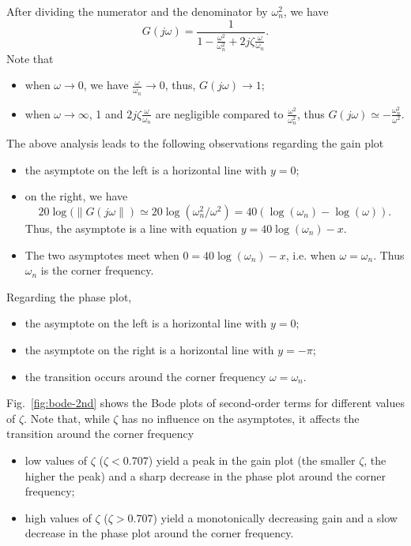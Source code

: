 \documentclass[a4paper,11pt]{report}
\theoremstyle{definition}
\begin{document}
After dividing the numerator and the denominator by $\omega_n^2$, we
have
\[
G(j\omega) = \frac{1}{1-\frac{\omega^2}{\omega_n^2} +2j\zeta\frac{\omega}{\omega_n}}.
\]
Note that 
\begin{itemize}
\item when $\omega\to 0$, we have $\frac{\omega}{\omega_n} \to 0$,
  thus, $G(j\omega)\to 1$;
\item when  $\omega\to\infty$, 1 and $2j\zeta\frac{\omega}{\omega_n}$
  are negligible compared to $\frac{\omega^2}{\omega_n^2}$, thus
    $G(j\omega)\simeq -\frac{\omega_n^2}{\omega^2}$.
\end{itemize}

The above analysis leads to the following observations regarding the
gain plot
\begin{itemize}
\item the asymptote on the left is a horizontal line with $y=0$;
\item on the right, we have 
  \[
  20\log(\|G(j\omega\|)\simeq20\log(\omega_n^2/\omega^2)=40(\log(\omega_n)-\log(\omega)).
  \]
  Thus, the asymptote is a line with equation $y=40\log(\omega_n)-x$.
\item The two asymptotes meet when $0=40\log(\omega_n)-x$, i.e. when
  $\omega=\omega_n$. Thus $\omega_n$ is the corner frequency.
\end{itemize}

Regarding the phase plot, 
\begin{itemize}
\item the asymptote on the left is a horizontal line with $y=0$;
\item the asymptote on the right is a horizontal line with $y=-\pi$;
\item the transition occurs around the corner frequency $\omega=\omega_n$.
\end{itemize}


Fig.~\ref{fig:bode-2nd} shows the Bode plots of second-order terms for
different values of $\zeta$. Note that, while $\zeta$ has no influence
on the asymptotes, it affects the transition around the corner
frequency
\begin{itemize}
\item low values of $\zeta$ ($\zeta<0.707$) yield a peak in the gain
  plot (the smaller $\zeta$, the higher the peak) and a sharp decrease
  in the phase plot around the corner frequency;
\item high values of $\zeta$ ($\zeta>0.707$) yield a monotonically
  decreasing gain and a slow decrease in the phase plot around the
  corner frequency.
\end{itemize}
\end{document}
